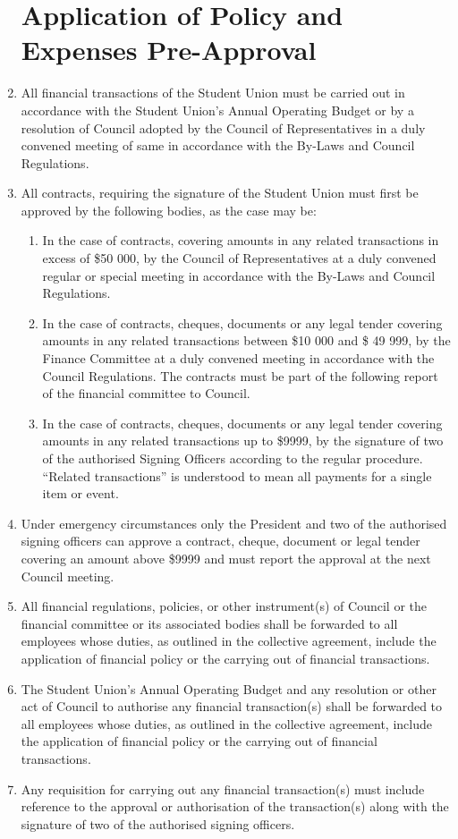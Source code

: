 \documentclass[oneside]{book}
\begin{document}
\begin{enumerate}
\chapter{\label{Application_of_Policy_and_Expenses_Pre-Approval}Application
of Policy and Expenses Pre-Approval }
\item All financial transactions of the Student Union must be carried out
in accordance with the Student Union's Annual Operating Budget or
by a resolution of Council adopted by the Council of Representatives
in a duly convened meeting of same in accordance with the By-Laws
and Council Regulations. 
\item All contracts, requiring the signature of the Student Union must first
be approved by the following bodies, as the case may be: 

\begin{enumerate}
\item In the case of contracts, covering amounts in any related transactions
in excess of \$50 000, by the Council of Representatives at a duly
convened regular or special meeting in accordance with the By-Laws
and Council Regulations. 
\item In the case of contracts, cheques, documents or any legal tender covering
amounts in any related transactions between \$10 000 and \$ 49 999,
by the Finance Committee at a duly convened meeting in accordance
with the Council Regulations. The contracts must be part of the following
report of the financial committee to Council. 
\item In the case of contracts, cheques, documents or any legal tender covering
amounts in any related transactions up to \$9999, by the signature
of two of the authorised Signing Officers according to the regular
procedure. ``Related transactions'' is understood
to mean all payments for a single item or event. 
\end{enumerate}
\item Under emergency circumstances only the President and two of the authorised
signing officers can approve a contract, cheque, document or legal
tender covering an amount above \$9999 and must report the approval
at the next Council meeting. 
\item All financial regulations, policies,
or other instrument(s) of Council or the financial committee or its associated bodies shall be forwarded to all
employees whose duties, as outlined in the collective agreement, include the application of financial policy
or the carrying out of financial transactions.
\item The Student Union’s Annual
Operating Budget and any resolution or other act of Council to authorise any financial transaction(s) shall be
forwarded to all employees whose duties, as outlined in the collective agreement, include the application of
financial policy or the carrying out of financial transactions.
\item Any requisition for carrying out any
financial transaction(s) must include reference to the approval or authorisation of the transaction(s) along
with the signature of two of the authorised signing officers.


\end{enumerate}
\end{document}
